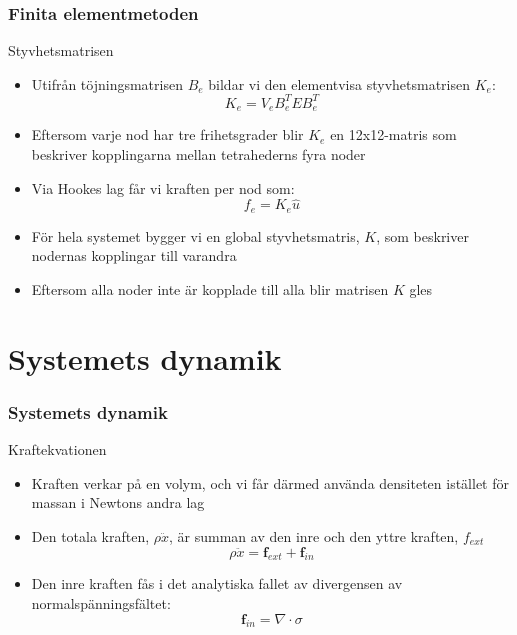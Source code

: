 \documentclass{beamer}
\begin{document}
\begin{frame}
\frametitle{Finita elementmetoden}
\begin{block}{Styvhetsmatrisen}
\begin{itemize}
\item Utifrån töjningsmatrisen $B_e$ bildar vi den elementvisa styvhetsmatrisen $K_e$:
	\begin{equation}\label{eqn:stiffnessmatrix}
    	K_{e} = V_{e} B_ {e}^{T}EB_ {e}^{T}
	\end{equation}
\item Eftersom varje nod har tre frihetsgrader blir $K_e$ en 12x12-matris som beskriver kopplingarna mellan tetrahederns fyra noder
\item Via Hookes lag får vi kraften per nod som:
	\begin{equation}\label{eqn:stiffnessmatrix}
    	f_{e} = K_ {e}\hat{u}
	\end{equation}
\item För hela systemet bygger vi en global styvhetsmatris, $K$, som beskriver nodernas kopplingar till varandra
\item Eftersom alla noder inte är kopplade till alla blir matrisen $K$ gles
\end{itemize}

\end{block}
\end{frame}


\section{Systemets dynamik}
\begin{frame}
\frametitle{Systemets dynamik}
\begin{block}{Kraftekvationen}
\begin{itemize}
\item Kraften verkar på en volym, och vi får därmed använda densiteten istället för massan i Newtons andra lag
\item Den totala kraften, $\rho \ddot{x}$, är summan av den inre och den yttre kraften, $f_{ext}$
	\begin{equation}
		\rho \ddot{x} = \mathbf{f}_{ext} + \mathbf{f}_{in}
	\end{equation}
\item Den inre kraften fås i det analytiska fallet av divergensen av normalspänningsfältet:
	\begin{equation}
		\mathbf{f}_{in} = \nabla \cdot \sigma 
	\end{equation}	
		
\end{itemize}	
\end{block}
\end{frame}
\end{document}
